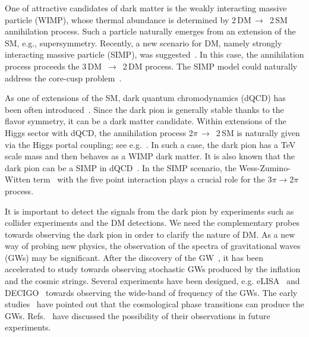 \documentclass[a4paper,preprint,superscriptaddress,preprintnumbers,nofootinbib]{revtex4}
\begin{document}
One of attractive candidates of dark matter is the weakly interacting massive particle (WIMP),
whose thermal abundance is determined by 2\,DM\,$\to$\, 2\,SM annihilation process. 
Such a particle naturally emerges from an extension of the SM, e.g., supersymmetry.
Recently, a new scenario for DM, namely strongly interacting massive particle (SIMP), was suggested~\cite{Hochberg:2014dra}.
In this case, the annihilation process proceeds the 3\,DM\, $\to$\, 2\,DM process.
The SIMP model could naturally address the core-cusp problem~\cite{Hochberg:2014dra}.

As one of extensions of the SM, dark quantum chromodynamics (dQCD) has been often introduced~\cite{Hur:2007uz,Hur:2011sv,Heikinheimo:2013fta,Farzinnia:2013pga,Foot:2013hna}.
Since the dark pion is generally stable thanks to the flavor symmetry, it can be a dark matter candidate.
Within extensions of the Higgs sector with dQCD, the annihilation process 2$\pi$\,$\to$\, 2\,SM is naturally given via the Higgs portal coupling; see e.g.~\cite{Heikinheimo:2013fta,Farzinnia:2013pga,Holthausen:2013ota}.
In such a case, the dark pion has a TeV scale mass and then behaves as a WIMP dark matter.
It is also known that the dark pion can be a SIMP in dQCD~\cite{Hochberg:2014kqa,Hochberg:2015vrg}.
In the SIMP scenario, the Wess-Zumino-Witten term~\cite{Wess:1971yu,Witten:1983tw,Witten:1983tx} with the five point interaction plays a crucial role for the $3\pi\to2\pi$ process.


It is important to detect the signals from the dark pion by experiments such as collider experiments and the DM detections.
We need the complementary probes towards observing the dark pion in order to clarify the nature of DM.
As a new way of probing new physics, the observation of the spectra of gravitational waves (GWs) may be significant.
After the discovery of the GW~\cite{Abbott:2016blz}, it has been accelerated to study towards observing stochastic GWs produced by the inflation and the cosmic strings.
Several experiments have been designed, e.g. eLISA~\cite{Seoane:2013qna,Audley:2017drz} and DECIGO~\cite{Seto:2001qf,Kawamura:2006up,Kawamura:2011zz} towards observing the wide-band of frequency of the GWs.
The early studies~\cite{Witten:1984rs,Hogan:1986qda,Turner:1990rc} have pointed out that the cosmological phase transitions can produce the GWs.
Refs.~\cite{Maggiore:1999vm,Kahniashvili:2008pf,Caprini:2010xv,Binetruy:2012ze,Schwaller:2015tja,Caprini:2015zlo,Huber:2015znp,Leitao:2015fmj,Dev:2016feu,Addazi:2016fbj,Huang:2016cjm,Huang:2017laj,Cai:2017cbj,Addazi:2017gpt} have discussed the possibility of their observations in future experiments.
\end{document}
